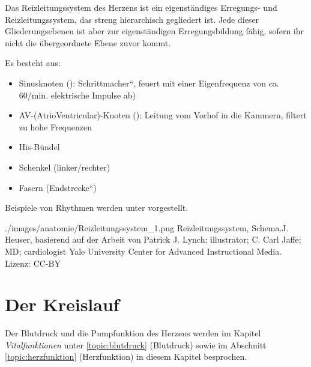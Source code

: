 {%
Das Reizleitungssystem des Herzens ist ein eigenständiges  Erregungs- und 
Reizleitungssystem, das streng hierarchisch gegliedert ist. Jede dieser
Gliederungsebenen ist aber zur eigenständigen Erregungsbildung fähig, sofern
ihr nicht die übergeordnete Ebene zuvor kommt.

Es besteht aus:

\begin{itemize}
\item Sinusknoten   
({}):  
{\quotedblbase}Schrittmacher{\textquotedblleft}, feuert mit einer
Eigenfrequenz von ca. 60/min. elektrische Impulse ab)
\item AV-(AtrioVentricular)-Knoten ({}): Leitung
vom Vorhof in die Kammern, filtert zu hohe Frequenzen
\item His-Bündel  
\item {}Schenkel (linker/rechter)
\item {}Fasern
({\quotedblbase}Endstrecke{\textquotedblleft})
\end{itemize}


Beispiele von Rhythmen werden unter 
vorgestellt. 

}{}{./images/anatomie/Reizleitungssystem_1.png}{
Reizleitungssystem, Schema.}{J. Heuser,
basierend auf der Arbeit von Patrick J. Lynch; illustrator;
C. Carl Jaffe; MD; cardiologist Yale University Center for
Advanced Instructional Media. Lizenz: CC-BY}








\section{Der Kreislauf }
\label{topic:blutkreislauf} 


\noindent Der Blutdruck und die Pumpfunktion des Herzens werden im
Kapitel \emph{Vitalfunktionen} unter \ref{topic:blutdruck}
(Blutdruck) sowie im Abschnitt \ref{topic:herzfunktion}
(Herzfunktion) in diesem Kapitel besprochen.

